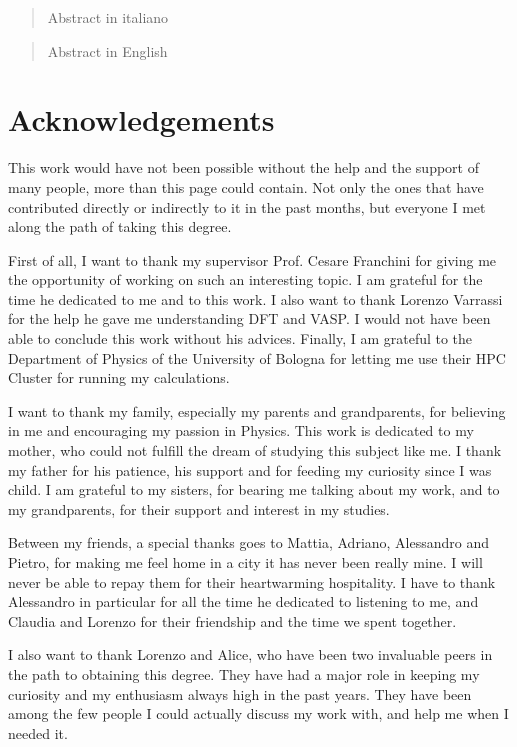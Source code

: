 \begin{abstract}
    Abstract in italiano
\end{abstract}

\begin{abstract}
    Abstract in English
\end{abstract}

\chapter*{Acknowledgements}
This work would have not been possible without the help and the support of many people, more than this page could contain. Not only the ones that have contributed directly or indirectly to it in the past months, but everyone I met along the path of taking this degree.

First of all, I want to thank my supervisor Prof. Cesare Franchini for giving me the opportunity of working on such an interesting topic. I am grateful for the time he dedicated to me and to this work. I also want to thank Lorenzo Varrassi for the help he gave me understanding DFT and VASP. I would not have been able to conclude this work without his advices. Finally, I am grateful to the Department of Physics of the University of Bologna for letting me use their HPC Cluster for running my calculations.

I want to thank my family, especially my parents and grandparents, for believing in me and encouraging my passion in Physics. This work is dedicated to my mother, who could not fulfill the dream of studying this subject like me. I thank my father for his patience, his support and for feeding my curiosity since I was child. I am grateful to my sisters, for bearing me talking about my work, and to my grandparents, for their support and interest in my studies.

Between my friends, a special thanks goes to Mattia, Adriano, Alessandro and Pietro, for making me feel home in a city it has never been really mine. I will never be able to repay them for their heartwarming hospitality. I have to thank Alessandro in particular for all the time he dedicated to listening to me, and Claudia and Lorenzo for their friendship and the time we spent together.

I also want to thank Lorenzo and Alice, who have been two invaluable peers in the path to obtaining this degree. They have had a major role in keeping my curiosity and my enthusiasm always high in the past years. They have been among the few people I could actually discuss my work with, and help me when I needed it.

